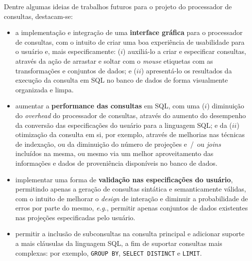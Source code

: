 Dentre algumas ideias de trabalhos futuros para o projeto do processador de consultas, destacam-se:

\begin{itemize}
    \item a implementação e integração de uma \textbf{interface gráfica} para o processador de consultas, com o intuito de criar uma boa experiência de usabilidade para o usuário e, mais especificamente: (\(i\)) auxiliá-lo a criar e especificar consultas, através da ação de arrastar e soltar com o \textit{mouse} etiquetas com as transformações e conjuntos de dados; e (\(ii\)) apresentá-lo os resultados da execução da consulta em SQL no banco de dados de forma visualmente organizada e limpa.
    \item aumentar a \textbf{performance das consultas} em SQL, com uma (\(i\)) diminuição do \textit{overhead} do processador de consultas, através do aumento do desempenho da conversão das especificações do usuário para a linguagem SQL; e da (\(ii\)) otimização da consulta em si, por exemplo, através de melhorias nas técnicas de indexação, ou da diminuição do número de projeções e~/~ou \textit{joins} incluídos na mesma, ou mesmo via um melhor aproveitamento das informações e dados de proveniência disponíveis no banco de dados.
    \item implementar uma forma de \textbf{validação nas especificações do usuário}, permitindo apenas a geração de consultas sintática e semanticamente válidas, com o intuito de melhorar o \textit{design} de interação e diminuir a probabilidade de erros por parte do mesmo, \textit{e.g.}, permitir apenas conjuntos de dados existentes nas projeções especificadas pelo usuário.
    \item permitir a inclusão de subconsultas na consulta principal e adicionar suporte a mais cláusulas da linguagem SQL, a fim de suportar consultas mais complexas: por exemplo, \texttt{GROUP BY}, \texttt{SELECT DISTINCT} e \texttt{LIMIT}.
\end{itemize}
